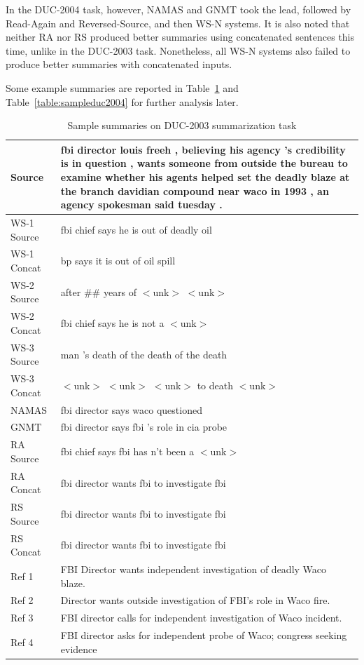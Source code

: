 \documentclass[letterpaper]{article} %
\begin{document}
In the DUC-2004 task, however, NAMAS and GNMT took the lead, followed by Read-Again and Reversed-Source, and then WS-N systems. It is also noted that neither RA nor RS produced better summaries using concatenated sentences this time, unlike in the DUC-2003 task. Nonetheless, all WS-N systems also failed to produce better summaries with concatenated inputs.

Some example summaries are reported in Table~\ref{table:sampleduc2003} and Table~\ref{table:sampleduc2004} for further analysis later.

\begin{table}[h]
	\begin{tabular}{p{40pt} p{170pt}}
		Source & fbi director louis freeh , believing his agency 's credibility is in question , wants someone from outside the bureau to examine whether his agents helped set the deadly blaze at the branch davidian compound near waco in 1993 , an agency spokesman said tuesday .\\
		\hline
		WS-1 Source & fbi chief says he is out of deadly oil \\
		WS-1 Concat & bp says it is out of oil spill \\
		WS-2 Source & after \#\# years of $<$unk$>$ $<$unk$>$ \\
		WS-2 Concat & fbi chief says he is not a $<$unk$>$ \\
		WS-3 Source & man 's death of the death of the death \\
		WS-3 Concat & $<$unk$>$  $<$unk$>$  $<$unk$>$  to death $<$unk$>$  \\
		NAMAS & fbi director says waco questioned \\
		GNMT & fbi director says fbi 's role in cia probe \\
		RA Source & fbi chief says fbi has n't been a $<$unk$>$ \\
		RA Concat & fbi director wants fbi to investigate fbi \\
		RS Source & fbi director wants fbi to investigate fbi \\
		RS Concat & fbi director wants fbi to investigate fbi \\
		\hline
		Ref 1 & FBI Director wants independent investigation of deadly Waco blaze.\\
		Ref 2 & Director wants outside investigation of FBI's role in Waco fire.\\
		Ref 3 & FBI director calls for independent investigation of Waco incident.\\
		Ref 4 & FBI director asks for independent probe of Waco; congress seeking evidence
	\end{tabular}
	\caption{Sample summaries on DUC-2003 summarization task}
	\label{table:sampleduc2003}
\end{table}
\end{document}
